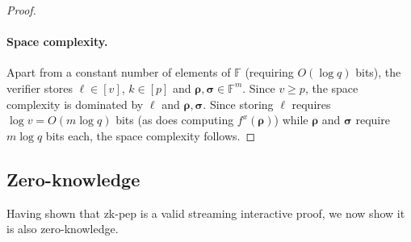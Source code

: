 \documentclass[10pt,a4paper]{article}
\newif\iflipics\lipicsfalse
\theoremstyle{definition}
\newcommand{\field}{\mathbb{F}}
\newcommand{\vcommitlength}{v}
\newcommand{\pcommitlength}{p}
\newcommand{\dimension}{m}
\newcommand{\fieldsize}{q}
\newcommand{\fingerprinttuple}{\bm{\rho}}
\newcommand{\Fingerprinttuple}{\bm{\sigma}}
\begin{document}
\begin{proof}
    \paragraph*{Space complexity\iflipics\else.\fi} Apart from a constant number of elements of $\field$ (requiring $O(\log \fieldsize)$ bits), the verifier stores $\ell \in [\vcommitlength]$, $k \in [\pcommitlength]$ and $\fingerprinttuple, \Fingerprinttuple \in \field^\dimension$. Since $\vcommitlength \geq \pcommitlength$, the space complexity is dominated by $\ell$ and $\fingerprinttuple, \Fingerprinttuple$. Since storing $\ell$ requires $\log \vcommitlength = O(\dimension \log \fieldsize)$ bits (as does computing $f^x(\fingerprinttuple)$) while $\fingerprinttuple$ and $\Fingerprinttuple$ require $\dimension \log \fieldsize$ bits each, the space complexity follows.
\end{proof}

\subsection{Zero-knowledge}

Having shown that \textsf{zk-pep} is a valid streaming interactive proof, we now show it is also zero-knowledge.
\end{document}
